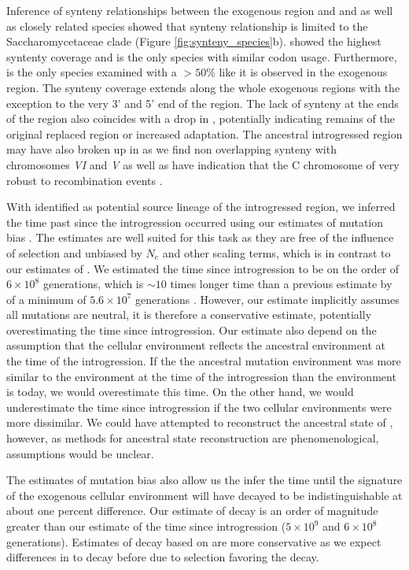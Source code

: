 Inference of synteny relationships between the exogenous region and \dubl and \gossypii as well as closely related species showed that synteny relationship is limited to the Saccharomycetaceae clade (Figure \ref{fig:synteny_species}b).
\gossypii showed the highest syntenty coverage and is the only species with similar codon usage.
Furthermore, \gossypii is the only species examined with a \GC $> 50 \%$ like it is observed in the exogenous region.
The synteny coverage extends along the whole exogenous regions with the exception to the very 3' and 5' end of the region. 
The lack of synteny at the ends of the region also coincides with a drop in \GC, potentially indicating remains of the original replaced region or increased adaptation.
The ancestral introgressed region may have also broken up in \gossypii as we find non overlapping synteny with chromosomes \emph{VI} and \emph{V} as well as have indication that the C chromosome of \kluyveri very robust to recombination events \citep{payen2009, vakirlis2016}. 

With \gossypii identified as potential source lineage of the introgressed region, we inferred the time past since the introgression occurred using our estimates of mutation bias \DM.
The \DM estimates are well suited for this task as they are free of the influence of selection and unbiased by $N_e$ and other scaling terms, which is in contrast to our estimates of \DE \citep{gilchrist2015}.
We estimated the time since introgression to be on the order of $6\times 10^8$ generations, which is $\sim 10$ times longer time than a previous estimate by \citet{friedrich2015} of a minimum of $5.6\times 10^7$ generations .
However, our estimate implicitly assumes all mutations are neutral, it is therefore a conservative estimate, potentially overestimating the time since introgression. 
Our estimate also depend on the assumption that the \gossypii cellular environment reflects the ancestral environment at the time of the introgression.
If the the ancestral mutation environment was more similar to the \kluyveri environment at the time of the introgression than the \gossypii environment is today, we would overestimate this time.
On the other hand, we would underestimate the time since introgression if the two cellular environments were more dissimilar.
We could have attempted to reconstruct the ancestral state of \gossypii, however, as methods for ancestral state reconstruction are phenomenological, assumptions would be unclear. 

The estimates of mutation bias \DM also allow us the infer the time until the signature of the exogenous cellular environment will have decayed to be indistinguishable at about one percent difference.
Our estimate of decay is an order of magnitude greater than our estimate of the time since introgression ($5\times 10^9$ and $6\times 10^8$ generations).
Estimates of decay based on \DM are more conservative as we expect differences in \DE to decay before due to selection favoring the decay.
 
